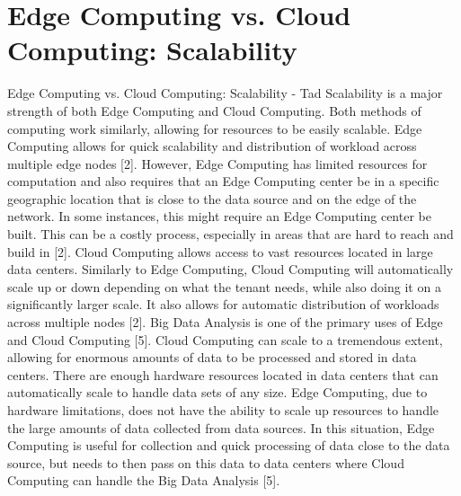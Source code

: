 \documentclass[conference]{IEEEtran}
\begin{document}
\section{Edge Computing vs. Cloud Computing: Scalability}
Edge Computing vs. Cloud Computing: Scalability - Tad
Scalability is a major strength of both Edge Computing and Cloud Computing. Both methods of computing work similarly, allowing for resources to be easily scalable. Edge Computing allows for quick scalability and distribution of workload across multiple edge nodes [2]. However, Edge Computing has limited resources for computation and also requires that an Edge Computing center be in a specific geographic location that is close to the data source and on the edge of the network. In some instances, this might require an Edge Computing center be built. This can be a costly process, especially in areas that are hard to reach and build in [2]. Cloud Computing allows access to vast resources located in large data centers. Similarly to Edge Computing, Cloud Computing will automatically scale up or down depending on what the tenant needs, while also doing it on a significantly larger scale. It also allows for automatic distribution of workloads across multiple nodes [2].
Big Data Analysis is one of the primary uses of Edge and Cloud Computing [5]. Cloud Computing can scale to a tremendous extent, allowing for enormous amounts of data to be processed and stored in data centers. There are enough hardware resources located in data centers that can automatically scale to handle data sets of any size. Edge Computing, due to hardware limitations, does not have the ability to scale up resources to handle the large amounts of data collected from data sources. In this situation, Edge Computing is useful for collection and quick processing of data close to the data source, but needs to then pass on this data to data centers where Cloud Computing can handle the Big Data Analysis [5].
\end{document}
